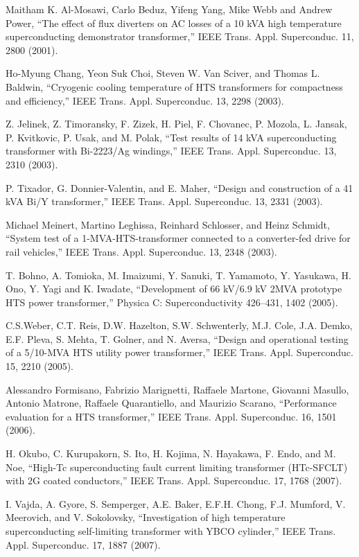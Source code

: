 \noindent [9.159] Maitham K. Al-Mosawi, Carlo Beduz, Yifeng Yang, Mike Webb and Andrew Power, ``The effect of flux diverters on AC losses of a 10 kVA high temperature
superconducting demonstrator transformer,” IEEE Trans. Appl. Superconduc.
11, 2800 (2001).

\noindent [9.160] Ho-Myung Chang, Yeon Suk Choi, Steven W. Van Sciver, and Thomas L. Baldwin,
``Cryogenic cooling temperature of HTS transformers for compactness and
efficiency,” IEEE Trans. Appl. Superconduc. 13, 2298 (2003).

\noindent [9.161] Z. Jelinek, Z. Timoransky, F. Zizek, H. Piel, F. Chovanec, P. Mozola, L. Jansak,
P. Kvitkovic, P. Usak, and M. Polak, ``Test results of 14 kVA superconducting
transformer with Bi-2223/Ag windings,” IEEE Trans. Appl. Superconduc. 13,
2310 (2003).

\noindent [9.162] P. Tixador, G. Donnier-Valentin, and E. Maher, ``Design and construction of a
41 kVA Bi/Y transformer,” IEEE Trans. Appl. Superconduc. 13, 2331 (2003).

\noindent [9.163] Michael Meinert, Martino Leghissa, Reinhard Schlosser, and Heinz Schmidt, ``System
test of a 1-MVA-HTS-transformer connected to a converter-fed drive for rail
vehicles,” IEEE Trans. Appl. Superconduc. 13, 2348 (2003).

\noindent [9.164] T. Bohno, A. Tomioka, M. Imaizumi, Y. Sanuki, T. Yamamoto, Y. Yasukawa,
H. Ono, Y. Yagi and K. Iwadate, ``Development of 66 kV/6.9 kV 2MVA prototype
HTS power transformer,” Physica C: Superconductivity 426–431, 1402 (2005).

\noindent [9.165] C.S.Weber, C.T. Reis, D.W. Hazelton, S.W. Schwenterly, M.J. Cole, J.A. Demko,
E.F. Pleva, S. Mehta, T. Golner, and N. Aversa, ``Design and operational testing
of a 5/10-MVA HTS utility power transformer,” IEEE Trans. Appl. Superconduc.
15, 2210 (2005).

\noindent [9.166] Alessandro Formisano, Fabrizio Marignetti, Raffaele Martone, Giovanni Masullo,
Antonio Matrone, Raffaele Quarantiello, and Maurizio Scarano, ``Performance
evaluation for a HTS transformer,” IEEE Trans. Appl. Superconduc. 16, 1501
(2006).

\noindent [9.167] H. Okubo, C. Kurupakorn, S. Ito, H. Kojima, N. Hayakawa, F. Endo, and M. Noe,
``High-Tc superconducting fault current limiting transformer (HTc-SFCLT) with
2G coated conductors,” IEEE Trans. Appl. Superconduc. 17, 1768 (2007).

\noindent [9.168] I. Vajda, A. Gyore, S. Semperger, A.E. Baker, E.F.H. Chong, F.J. Mumford,
V. Meerovich, and V. Sokolovsky, ``Investigation of high temperature superconducting
self-limiting transformer with YBCO cylinder,” IEEE Trans. Appl. Superconduc.
17, 1887 (2007).

